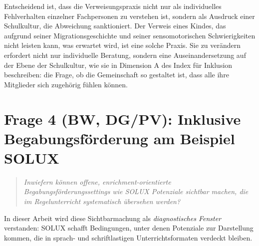 \documentclass[ngerman, a4paper]{article}
\begin{document}
Entscheidend ist, dass die Verweisungspraxis nicht nur als individuelles
Fehlverhalten einzelner Fachpersonen zu verstehen ist, sondern als Ausdruck
einer Schulkultur, die Abweichung sanktioniert. Der Verweis eines Kindes,
das aufgrund seiner Migrationsgeschichte und seiner sensomotorischen
Schwierigkeiten nicht leisten kann, was erwartet wird, ist eine solche
Praxis. Sie zu verändern erfordert nicht nur individuelle Beratung,
sondern eine Auseinandersetzung auf der Ebene der Schulkultur, wie sie
\textcite[S.\,101--125]{booth2019index} in Dimension A des Index für Inklusion
beschreiben: die Frage, ob die Gemeinschaft so gestaltet ist, dass alle
ihre Mitglieder sich zugehörig fühlen können.


\section{Frage 4 (BW, DG/PV): Inklusive Begabungsförderung am Beispiel SOLUX}
\label{sec:frage4}

\begin{quote}\itshape
  Inwiefern können offene, enrichment-orientierte
  Begabungsförderungssettings wie SOLUX Potenziale sichtbar machen, die
  im Regelunterricht systematisch übersehen werden?
\end{quote}

In dieser Arbeit wird diese Sichtbarmachung als \textit{diagnostisches Fenster}
verstanden: SOLUX schafft Bedingungen, unter denen Potenziale zur Darstellung
kommen, die in sprach- und schriftlastigen Unterrichtsformaten verdeckt bleiben.
\end{document}
